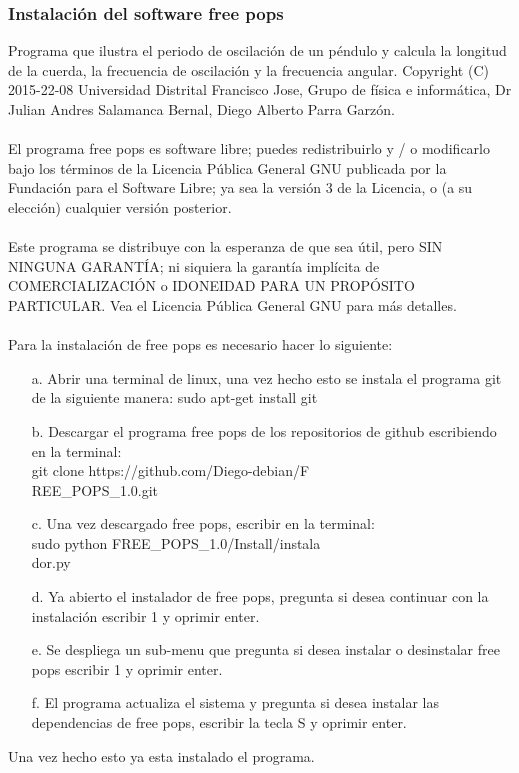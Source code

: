 \documentclass[12pt]{article}
\begin{document}
\begin{multicols}{2}
\subsubsection{Instalación del software free pops}
Programa que  ilustra el periodo de oscilación de un péndulo  y calcula la longitud de la cuerda, la frecuencia de oscilación y la frecuencia angular.   Copyright (C) 2015-22-08  Universidad Distrital Francisco Jose, Grupo de física e informática, Dr Julian Andres Salamanca Bernal, Diego Alberto Parra Garzón.
\\ \\ 
El programa free pops es software libre; puedes redistribuirlo y / o modificarlo bajo los términos de la Licencia Pública General GNU publicada por la Fundación para el Software Libre; ya sea la versión 3 de la Licencia, o (a su elección) cualquier versión posterior. 
\\ \\ 
Este programa se distribuye con la esperanza de que sea útil, pero SIN NINGUNA GARANTÍA; ni siquiera la garantía implícita de COMERCIALIZACIÓN o IDONEIDAD PARA UN PROPÓSITO PARTICULAR. Vea el Licencia Pública General GNU para más detalles. 
\\ \\
Para la instalación de free pops es necesario hacer lo siguiente:
\begin{enumerate}
\item[a. ] Abrir una terminal de linux, una vez hecho esto se instala el programa git de la siguiente manera: sudo apt-get install git 
\item[b. ] Descargar el programa free pops de los repositorios de github escribiendo en la terminal: \\git clone https://github.com/Diego-debian/F\\REE\_POPS\_1.0.git 
\item[c. ] Una vez descargado free pops, escribir en la terminal:\\sudo python FREE\_POPS\_1.0/Install/instala\\dor.py 
\item[d. ] Ya abierto el instalador de free pops, pregunta si desea continuar con la instalación escribir 1 y oprimir enter.
\item[e. ] Se despliega un sub-menu que pregunta si desea instalar o desinstalar free pops escribir 1 y oprimir enter.
\item[f. ] El programa actualiza el sistema y pregunta si desea instalar las dependencias de free pops, escribir la tecla S y oprimir enter. 
\end{enumerate}
Una vez hecho esto ya esta instalado el programa. 


\end{multicols}
\end{document}
